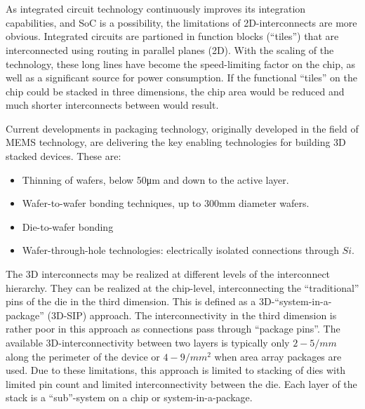 
\chapter{ \protect \\
    }

As integrated circuit technology continuously improves its integration
capabilities, and SoC is a possibility, the limitations of 2D-interconnects
are more obvious. Integrated circuits are partioned in function
blocks (``tiles'') that are interconnected using routing in parallel
planes (2D). With the scaling of the technology, these long lines
have become the speed-limiting factor on the chip, as well as a significant
source for power consumption. If the functional ``tiles'' on the
chip could be stacked in three dimensions, the chip area would be
reduced and much shorter interconnects between would result.

Current developments in packaging technology, originally developed
in the field of MEMS technology, are delivering the key
enabling technologies for building 3D stacked devices. These are:
\begin{itemize}
    \item Thinning of wafers, below 50μm and down to the active
    layer.
    \item Wafer-to-wafer bonding techniques, up to 300mm diameter
    wafers.
    \item Die-to-wafer bonding
    \item Wafer-through-hole technologies: electrically isolated connections
    through $Si$.
\end{itemize}

The 3D interconnects may be realized at different levels of the
interconnect hierarchy. They can be realized at the chip-level,
interconnecting the ``traditional'' pins of the die in the third
dimension. This is defined as a 3D-``system-in-a-package'' (3D-SIP)
approach. The interconnectivity in the third dimension is
rather poor in this approach as connections pass through ``package
pins''. The available 3D-interconnectivity between two layers is
typically only $2-5/mm$ along the perimeter of the device or $4-9/mm^2$
when area array packages are used. Due to these limitations, this
approach is limited to stacking of dies with limited pin count and
limited interconnectivity between the die. Each layer of the stack
is a ``sub''-system on a chip or system-in-a-package.

